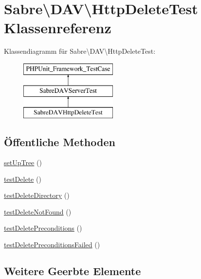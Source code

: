 \hypertarget{class_sabre_1_1_d_a_v_1_1_http_delete_test}{}\section{Sabre\textbackslash{}D\+AV\textbackslash{}Http\+Delete\+Test Klassenreferenz}
\label{class_sabre_1_1_d_a_v_1_1_http_delete_test}
Klassendiagramm für Sabre\textbackslash{}D\+AV\textbackslash{}Http\+Delete\+Test\+:\begin{figure}[H]
\begin{center}
\leavevmode
\includegraphics[height=3.000000cm]{class_sabre_1_1_d_a_v_1_1_http_delete_test}
\end{center}
\end{figure}
\subsection*{Öffentliche Methoden}
\begin{DoxyCompactItemize}
\item 
\mbox{\hyperlink{class_sabre_1_1_d_a_v_1_1_http_delete_test_ab9e9231c1ce3ba075bc6d374afd7d1e0}{set\+Up\+Tree}} ()
\item 
\mbox{\hyperlink{class_sabre_1_1_d_a_v_1_1_http_delete_test_aac9e47df83886ec291a2a2421d92ca15}{test\+Delete}} ()
\item 
\mbox{\hyperlink{class_sabre_1_1_d_a_v_1_1_http_delete_test_a41eb5909cc756f2fe9d1a77f7be0028e}{test\+Delete\+Directory}} ()
\item 
\mbox{\hyperlink{class_sabre_1_1_d_a_v_1_1_http_delete_test_a787fc5631302dba4115e08f1405b34ab}{test\+Delete\+Not\+Found}} ()
\item 
\mbox{\hyperlink{class_sabre_1_1_d_a_v_1_1_http_delete_test_aeccedea7f846eb0a01ddf8aec3fff150}{test\+Delete\+Preconditions}} ()
\item 
\mbox{\hyperlink{class_sabre_1_1_d_a_v_1_1_http_delete_test_a6a92cfa39b3a12b1699b69f2a5251a38}{test\+Delete\+Preconditions\+Failed}} ()
\end{DoxyCompactItemize}
\subsection*{Weitere Geerbte Elemente}


